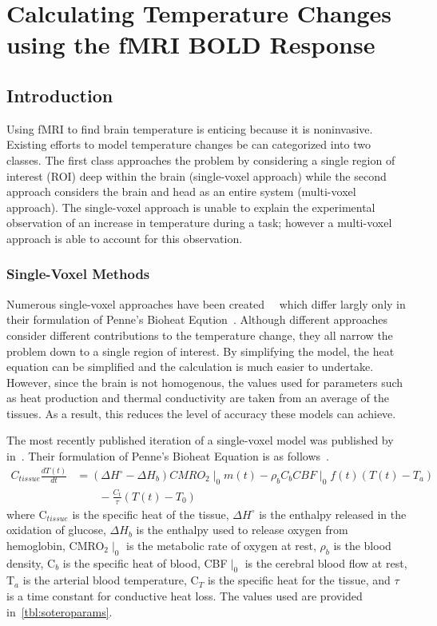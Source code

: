 \chapter{Calculating Temperature Changes using the fMRI BOLD Response}
  \section{\label{sec:tempmodelintro} Introduction}
  Using fMRI to find brain temperature is enticing because it is noninvasive.  Existing efforts to model temperature changes be can categorized into two classes.  The first class approaches the problem by considering a single region of interest (ROI) deep within the brain (single-voxel approach) while the second approach considers the brain and head as an entire system (multi-voxel approach). The single-voxel approach is unable to explain the experimental observation of an increase in temperature during a task; however a multi-voxel approach is able to account for this observation.

    \subsection{\label{sec:singlevox} Single-Voxel Methods}
    Numerous single-voxel approaches have been created ~\citep{sotero2011,yablonskiy,trubel}~which differ largly only in their formulation of Penne's Bioheat Eqution~\citep{pennes}.  Although different approaches consider different contributions to the temperature change, they all narrow the problem down to a single region of interest.  By simplifying the model, the heat equation can be simplified and the calculation is much easier to undertake.  However, since the brain is not homogenous, the values used for parameters such as heat production and thermal conductivity are taken from an average of the tissues.  As a result, this reduces the level of accuracy these models can achieve.
    
    The most recently published iteration of a single-voxel model was published by~\citet{sotero2011} in~\citeyear{sotero2011}. Their formulation of Penne's Bioheat Equation is as follows~\citep{pennes, sotero2011}.
    \begin{align}
      \label{eq:bioheat}
      C_{tissue} \frac{dT(t)}{dt} &= (\Delta H^{\circ}-\Delta H_{b}) CMRO_{2}\mid_{0} m(t) - \rho_{b} C_{b} CBF\mid_{0} f(t) (T(t) - T_{a}) \nonumber \\
      &\qquad {} - \frac{C_{t}}{\tau} (T(t)-T_{0})
    \end{align}
    where C$_{tissue}$ is the specific heat of the tissue, $\Delta H^{\circ}$ is the enthalpy released in the oxidation of glucose, $\Delta H_b$ is the enthalpy used to release oxygen from hemoglobin, CMRO$_2 \mid_0$ is the metabolic rate of oxygen at rest, $\rho_b$ is the blood density, C$_b$ is the specific heat of blood, CBF$\mid_0$ is the cerebral blood flow at rest, T$_a$ is the arterial blood temperature, C$_T$ is the specific heat for the tissue, and $\tau$ is a time constant for conductive heat loss.  The values used are provided in~\cref{tbl:soteroparams}.
    
